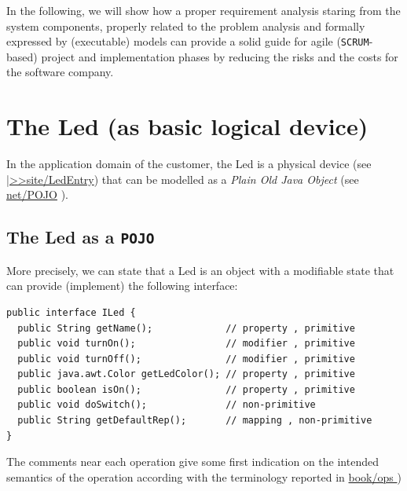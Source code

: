 In the following, we will show how a proper requirement analysis staring from the system components, properly related to the problem analysis and formally expressed by (executable) models can provide a solid guide for agile (\texttt{SCRUM}-based) project and implementation phases by reducing the risks and the costs for the software company.

\newpage 
\section{The Led (as basic logical device)}
In the application domain of the customer, the Led is a physical device (see
\href{https://137.204.107.21/syskb/it.unibo.iss2015intro/docs/Appls/ButtonLed/LedEntry.html}{|>>site/LedEntry}) that can be modelled  as a \textit{Plain Old Java Object} (see \href{https://en.wikipedia.org/wiki/Plain_Old_Java_Object}{net/POJO} ).


\subsection{The Led as a \texttt{POJO}}
%
More precisely, we can state that a Led is an object with a modifiable state that can provide (implement) the following interface:

\begin{lstlisting}
public interface ILed {
  public String getName();             // property , primitive	
  public void turnOn();                // modifier , primitive
  public void turnOff();               // modifier , primitive
  public java.awt.Color getLedColor(); // property , primitive
  public boolean isOn();               // property , primitive
  public void doSwitch();              // non-primitive
  public String getDefaultRep();       // mapping , non-primitive
}
\end{lstlisting}

The comments near each operation give some first indication on the intended semantics of the operation according with the terminology reported in \href{https://137.204.107.21/syskb/it.unibo.iss2015intro/docs/NatMolBook/content/book/sistemi/comportamentoSistemi.html}{book/ops	})


